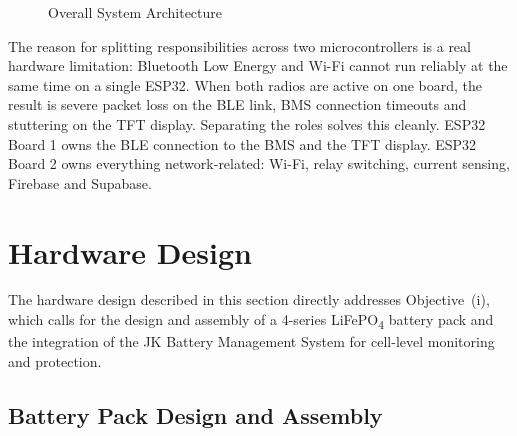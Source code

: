 \documentclass[12pt, a4paper]{report}
\begin{document}
{\begin{figure}[H]
\caption{Overall System Architecture}
\label{fig:sysarch}
\end{figure}



The reason for splitting responsibilities across two microcontrollers is
a real hardware limitation: Bluetooth Low Energy and Wi-Fi cannot run
reliably at the same time on a single ESP32. When both radios are active
on one board, the result is severe packet loss on the BLE link, BMS
connection timeouts and stuttering on the TFT display. Separating the
roles solves this cleanly. ESP32 Board 1 owns the BLE connection to the
BMS and the TFT display. ESP32 Board 2 owns everything network-related:
Wi-Fi, relay switching, current sensing, Firebase and Supabase.

\section{Hardware Design}

The hardware design described in this section directly addresses
Objective~(i), which calls for the design and assembly of a 4-series
LiFePO\textsubscript{4} battery pack and the integration of the JK Battery
Management System for cell-level monitoring and protection.

\subsection{Battery Pack Design and Assembly}

}
\end{document}
